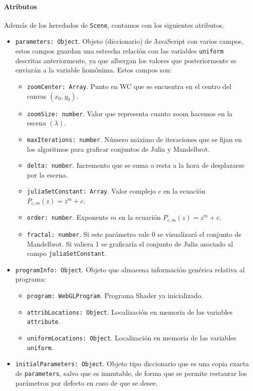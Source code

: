 \paragraph*{Atributos}
Además de los heredados de \verb|Scene|, contamos con los siguientes atributos.
\begin{itemize}
    \item \verb|parameters: Object|. Objeto (diccionario) de JavaScript con varios campos, estos campos guardan una estrecha relación con las variables \verb|uniform| descritas anteriormente, ya que albergan los valores que posteriormente se enviarán a la variable homónima. Estos campos son:
    \begin{itemize}
        \item \verb|zoomCenter: Array|. Punto en WC que se encuentra en el centro del canvas $(x_0,y_0)$.
        \item \verb|zoomSize: number|. Valor que representa cuanto zoom hacemos en la escena $(\lambda)$.
        \item \verb|maxIterations: number|. Número máximo de iteraciones que se fijan en los algoritmos para graficar conjuntos de Julia y Mandelbrot.
        \item \verb|delta: number|. Incremento que se suma o resta a la hora de desplazarse por la escena.
        \item \verb|juliaSetConstant: Array|. Valor complejo $c$ en la ecuación $P_{c,m}(z)=z^m + c$.
        \item \verb|order: number|. Exponente $m$ en la ecuación $P_{c,m}(z) = z^m + c$.
        \item \verb|fractal: number|. Si este parámetro vale 0 se visualizará el conjunto de Mandelbrot. Si valiera 1 se graficaría el conjunto de Julia asociado al campo \verb|juliaSetConstant|.
    \end{itemize}
    \item \verb|programInfo: Object|. Objeto que almacena información genérica relativa al programa:
    \begin{itemize}
        \item \verb|program: WebGLProgram|. Programa Shader ya inicializado.
        \item \verb|attribLocations: Object|. Localización en memoria de las variables \verb|attribute|.
        \item \verb|uniformLocations: Object|. Localización en memoria de las variables \verb|uniform|.
    \end{itemize}
    \item \verb|initialParameters: Object|. Objeto tipo diccionario que es una copia exacta de \verb|parameters|, salvo que es inmutable, de forma que se permite restaurar los parámetros por defecto en caso de que se desee.
\end{itemize}
